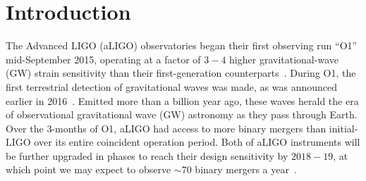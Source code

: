 \documentclass[aps,prd,amsmath,floats,floatfix, twocolumn,
superscriptaddress,nofootinbib,showpacs]{revtex4-1}
\begin{document}
\maketitle

\section{Introduction}\label{s1:introduction}

The Advanced LIGO (aLIGO) observatories began their first observing run ``O1''
mid-September 2015, operating at a factor of $3-4$ higher gravitational-wave
(GW) strain sensitivity than their first-generation 
counterparts~\cite{Shoemaker2009}.
% 
During O1, the first terrestrial detection of gravitational waves was made, as
was announced earlier in 2016~\cite{LIGOVirgo2016a}. Emitted more than a
billion year ago, these waves herald the era of observational gravitational
wave (GW) astronomy as they pass through Earth.
% 
Over the $3$-months of O1, aLIGO had access to more binary mergers than 
initial-LIGO over its entire coincident operation period. Both of aLIGO 
instruments will be further upgraded in phases to reach their design 
sensitivity by $2018-19$, at which point we may expect to observe $\sim 70$ 
binary mergers a year~\cite{Abadie:2010cf}.
\end{document}
